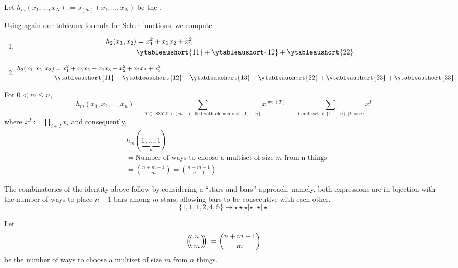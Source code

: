 \documentclass[11pt,leqno,oneside]{amsart}
\numberwithin{thm}{section}
\DeclareMathOperator{\SSYT}{SSYT}
\DeclareMathOperator{\wt}{wt}
\def\multiset#1#2{\ensuremath{\left(\kern-.3em\left(\genfrac{}{}{0pt}{}{#1}{#2}\right)\kern-.3em\right)}}
\begin{document}
\begin{defn}
  Let \(h_m(x_1, \ldots, x_N) := s_{(m)}(x_1, \ldots, x_N)\) be the
  .
\end{defn}
\begin{example}
  Using again our tableaux formula for Schur functions, we compute
  \begin{enumerate}
  \item
    \begin{align*}
      h_2(x_1,x_2) & = x_1^2 + x_1 x_2 + x_2^2\\
      & \ytableaushort{11} + \ytableaushort{12} + \ytableaushort{22}
    \end{align*}
  \item
    \begin{align*}
      h_2(x_1,x_2,x_3)
      & = x_1^2 + x_1 x_2 + x_1 x_3 + x_2^2 + x_2 x_3 + x_3^2\\
      & \ytableaushort{11} + \ytableaushort{12} + \ytableaushort{13} +
      \ytableaushort{22} + \ytableaushort{23} + \ytableaushort{33}
    \end{align*}
  \end{enumerate}
\end{example}
\begin{prop}
  For \(0 < m \leq n\), 
  \[
    h_m(x_1, x_2, \ldots, x_n) = \sum_{T \in \SSYT((m)) \text{
        filled with elements of }\{1,\ldots,n\}} x^{\wt(T)} = \sum_{I
      \text{ multiset of }
      \{1, \ldots, n\}, |I| = m} x^I
  \]
  where \(x^I := \prod_{i \in I} x_i\) and consequently,
  \begin{align*}
    & h_m(\underbrace{1, \ldots, 1}_n)  \\
    & = \text{Number of ways to choose
      a multiset of size } m \text{ from n things} \\
    & = \binom{n+m-1}{m} = \binom{n+m-1}{n-1}
  \end{align*}
\end{prop}
\begin{rmk}
  The combinatorics of the identity above follow by considering a
  ``stars and bars'' approach, namely, both expressions are in
  bijection with the number of ways to place \(n-1\) bars among
  \(m\) 
  stars, allowing bars to be consecutive with each other. \[
    \{1,1,1,2,4,5\} \to \star \star \star | \star || \star | \star
  \]
\end{rmk}
\begin{defn}
  Let \[
    \multiset{n}{m} := \binom{n+m-1}{m}
  \]
  be the number of ways to choose a multiset of size \(m\) from \(n\)
  things. 
\end{defn}
\end{document}
